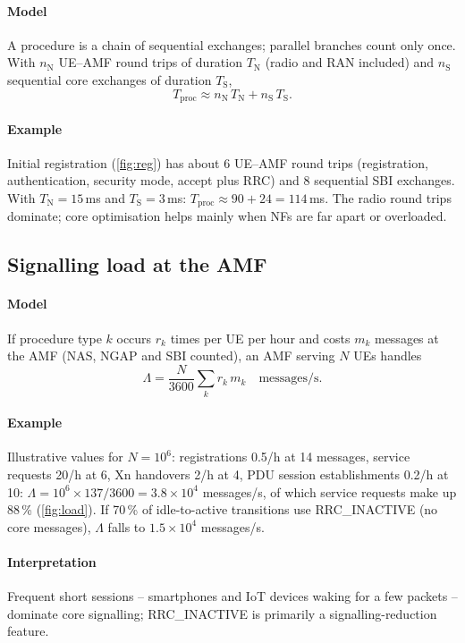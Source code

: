 \documentclass[11pt,a4paper]{article}
\begin{document}
\paragraph{Model} A procedure is a chain of sequential exchanges; parallel branches count only once. With $n_{\mathrm{N}}$ UE--AMF round trips of
duration $T_{\mathrm{N}}$ (radio and RAN included) and $n_{\mathrm{S}}$ sequential core exchanges of duration $T_{\mathrm{S}}$,
\begin{equation}\label{eq:latency}
  T_{\mathrm{proc}} \approx n_{\mathrm{N}}\,T_{\mathrm{N}} + n_{\mathrm{S}}\,T_{\mathrm{S}} .
\end{equation}
\paragraph{Example} Initial registration (\cref{fig:reg}) has about 6 UE--AMF round trips (registration, authentication, security mode, accept
plus RRC) and 8 sequential SBI exchanges. With $T_{\mathrm{N}} = 15$\,ms and $T_{\mathrm{S}} = 3$\,ms: $T_{\mathrm{proc}} \approx 90 + 24 = 114$\,ms. The radio
round trips dominate; core optimisation helps mainly when NFs are far apart or overloaded.

\subsection{Signalling load at the AMF}\label{sec:load}
\paragraph{Model} If procedure type $k$ occurs $r_k$ times per UE per hour and costs $m_k$ messages at the AMF (NAS, NGAP and SBI counted), an AMF
serving $N$ UEs handles
\begin{equation}\label{eq:load}
  \Lambda = \frac{N}{3600}\sum_k r_k\, m_k \quad \text{messages/s}.
\end{equation}
\paragraph{Example} Illustrative values for $N = 10^6$: registrations 0.5/h at 14 messages, service requests 20/h at 6, Xn handovers 2/h at 4, PDU
session establishments 0.2/h at 10: $\Lambda = 10^6\times137/3600 = 3.8\times10^4$ messages/s, of which service requests make up 88\,\%
(\cref{fig:load}). If 70\,\% of idle-to-active transitions use RRC\_INACTIVE (no core messages), $\Lambda$ falls to $1.5\times10^4$ messages/s.
\paragraph{Interpretation} Frequent short sessions -- smartphones and IoT devices waking for a few packets -- dominate core signalling; RRC\_INACTIVE
is primarily a signalling-reduction feature.
\end{document}
